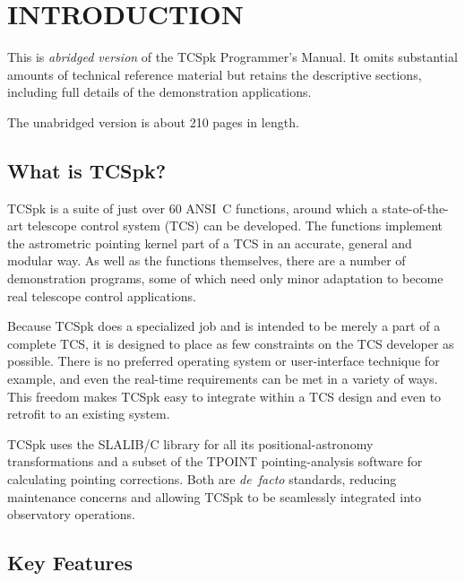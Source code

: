 \documentclass[12pt,fleqn,twoside]{article}
\renewcommand{\_}{{\tt\char'137}}     %
\begin{document}
\newcommand{\fstring}[1]{\hbox{\hspace{0.05em}$'${\tt#1}\hspace{0.05em}$'$}}

\renewcommand{\_}{{\tt\char'137}}

\cleardoublepage
\section{INTRODUCTION}

\ifx\vdoc\vshort
This is {\it abridged version}\/ of the TCSpk Programmer's Manual.  It
omits substantial amounts of technical reference material but retains
the descriptive sections, including full details of the
demonstration applications.

The unabridged version is about 210 pages in length.
\fi

\subsection{What is TCSpk?}

TCSpk is a suite of just over 60 ANSI~C functions, around
which a state-of-the-art
telescope control system (TCS) can be developed. The
functions implement the astrometric pointing kernel part of a TCS
in an accurate, general and modular way.
As well as the functions themselves, there are a number of
demonstration programs, some of which need only minor
adaptation to become real telescope control applications.

Because TCSpk does a specialized job and is intended
to be merely a part of a complete TCS, it is designed to
place as few constraints on the TCS developer as possible.  There is no
preferred operating system or user-interface technique for example, and
even the real-time requirements can be met in a variety of
ways.  This
freedom makes TCSpk easy to integrate within a TCS design
and even to retrofit to an existing system.

TCSpk uses the SLALIB/C library for
all its positional-astronomy transformations and a
subset of the TPOINT pointing-analysis
software for calculating pointing corrections.  Both are
{\it de~facto}\/ standards, reducing maintenance
concerns and allowing TCSpk to be
seamlessly integrated into observatory operations.

\subsection{Key Features}
\end{document}
